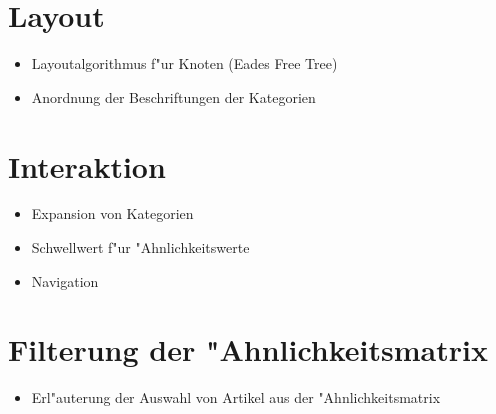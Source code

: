 

\section{Layout}
\begin{itemize}
    \item Layoutalgorithmus f"ur Knoten (Eades Free Tree)
    \item Anordnung der Beschriftungen der Kategorien
\end{itemize}

\section{Interaktion}
\begin{itemize}
    \item Expansion von Kategorien
    \item Schwellwert f"ur "Ahnlichkeitswerte
    \item Navigation
\end{itemize}


\section{Filterung der "Ahnlichkeitsmatrix}
\begin{itemize}
    \item Erl"auterung der Auswahl von Artikel aus der "Ahnlichkeitsmatrix
\end{itemize}













